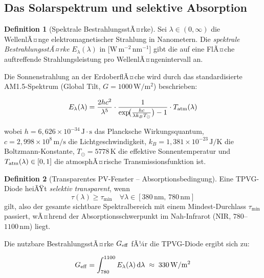 ﻿\documentclass[a4paper,12pt]{article}
\theoremstyle{definition}
\newtheorem{definition}{Definition}[section]
\theoremstyle{remark}
\newcommand{\diff}{\mathrm{d}}
\begin{document}
\subsection{Das Solarspektrum und selektive Absorption}

\begin{definition}[Spektrale BestrahlungsstÃ¤rke]
Sei $\lambda \in (0, \infty)$ die WellenlÃ¤nge elektromagnetischer Strahlung in
Nanometern. Die \emph{spektrale BestrahlungsstÃ¤rke} $E_\lambda(\lambda)$ in
[$\mathrm{W\,m^{-2}\,nm^{-1}}$] gibt die auf eine FlÃ¤che auftreffende Strahlungsleistung
pro WellenlÃ¤ngenintervall an.
\end{definition}

Die Sonnenstrahlung an der ErdoberflÃ¤che wird durch das standardisierte
AM1.5-Spektrum (Global Tilt, $G = 1000\,\mathrm{W/m^2}$) beschrieben:

\begin{equation}
  E_\lambda(\lambda) = \frac{2hc^2}{\lambda^5}
    \cdot \frac{1}{\exp\!\bigl(\frac{hc}{\lambda k_B T_\odot}\bigr) - 1}
    \cdot T_{\rm atm}(\lambda)
  \label{eq:planck}
\end{equation}

wobei $h = 6{,}626 \times 10^{-34}\,\mathrm{J\cdot s}$ das Plancksche
Wirkungsquantum, $c = 2{,}998 \times 10^8\,\mathrm{m/s}$ die Lichtgeschwindigkeit,
$k_B = 1{,}381 \times 10^{-23}\,\mathrm{J/K}$ die Boltzmann-Konstante,
$T_\odot = 5778\,\mathrm{K}$ die effektive Sonnentemperatur und
$T_{\rm atm}(\lambda) \in [0,1]$ die atmosphÃ¤rische Transmissionsfunktion ist.

\begin{definition}[Transparentes PV-Fenster -- Absorptionsbedingung]
Eine TPVG-Diode heiÃŸt \emph{selektiv transparent}, wenn
\begin{equation}
  \tau(\lambda) \geq \tau_{\min} \quad \forall \lambda \in [380\,\mathrm{nm},\, 780\,\mathrm{nm}]
  \label{eq:selektiv}
\end{equation}
gilt, also der gesamte sichtbare Spektralbereich mit einem Mindest-Durchlass
$\tau_{\min}$ passiert, wÃ¤hrend der Absorptionsschwerpunkt im
Nah-Infrarot (NIR, $780$--$1100\,\mathrm{nm}$) liegt.
\end{definition}

Die nutzbare BestrahlungsstÃ¤rke $G_{\rm eff}$ fÃ¼r die TPVG-Diode ergibt sich zu:

\begin{equation}
  G_{\rm eff} = \int_{780}^{1100} E_\lambda(\lambda)\,\diff\lambda
  \;\approx\; 330\,\mathrm{W/m^2}
  \label{eq:geff}
\end{equation}
\end{document}
